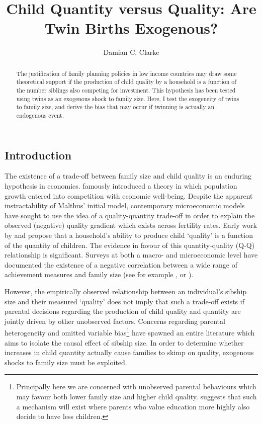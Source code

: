 \documentclass{article}[11pt,subeqn]
\title{Child Quantity versus Quality: Are Twin Births Exogenous?}
\author{Damian C. Clarke}
\begin{document}
\linenumbers
\begin{spacing}{1.25}

\maketitle
\begin{abstract}
The justification of family planning policies in low income countries may draw some theoretical support 
if the production of child quality by a household is a function of the number siblings also competing
for investment.  This hypothesis has been tested using twins as an exogenous shock to family size.  Here, I test
the exogeneity of twins to family size, and derive the bias that may occur if twinning is actually
an endogenous event.  
\end{abstract}

\section{Introduction}
The existence of a trade-off between family size and child quality is an enduring hypothesis in economics.  \citet{Malthus1798} famously introduced a theory in which population growth entered into competition with economic   
well-being.  Despite the apparent instractability of Malthus' initial model, contemporary microeconomic models have sought to use the idea of a quality-quantity trade-off in order to explain the observed (negative) quality gradient which exists across fertility rates.  Early work by \citet{BeckerLewis1973} and \citet{BeckerTomes1976} propose that a household's ability to produce child `quality' is a function of the quantity of children.  The evidence in favour of this quantity-quality (Q-Q) relationship is significant.  Surveys at both a macro- and microeconomic level have documented the existence of a negative correlation between a wide range of achievement measures and family size (see for example \cite{Desai1995}, or \cite{Hanushek1992}).

However, the empirically observed relationship between an individual's sibship size and their measured `quality' does not imply that such a trade-off exists if parental decisions regarding the production of child quality and quantity are jointly driven by other unobserved factors.  Concerns regarding parental heterogeneity and omitted variable bias\footnote{Principally here we are concerned with unobserved parental behaviours which may favour both lower family size and higher child quality.  \citet{Qian2009} suggests that such a mechanism will exist where parents who value education more highly also decide to have less children.} have spawned an entire literature which aims to isolate the causal effect of sibship size.  In order to determine whether increases in child quantity actually cause families to skimp on quality, exogenous shocks to family size must be exploited.


\end{spacing}
\end{document}
